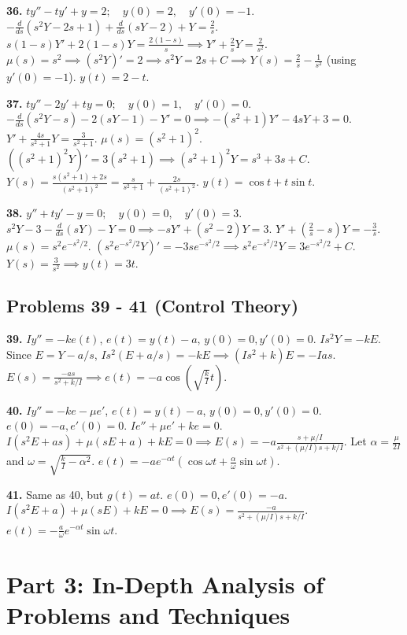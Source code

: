 \documentclass[11pt, letterpaper]{article}
\theoremstyle{definition}
\theoremstyle{remark}
\begin{document}
\textbf{36.} $ty'' - ty' + y = 2 ; \quad y(0) = 2 , \quad y'(0) = -1$.
$-\frac{d}{ds}(s^2 Y - 2s + 1) + \frac{d}{ds}(sY - 2) + Y = \frac{2}{s}$.
$s(1 - s)Y' + 2(1 - s)Y = \frac{2(1 - s)}{s} \implies Y' + \frac{2}{s}Y = \frac{2}{s^2}$.
$\mu(s) = s^2 \implies (s^2 Y)' = 2 \implies s^2 Y = 2s + C \implies Y(s) = \frac{2}{s} - \frac{1}{s^2}$ (using $y'(0)=-1$).
$y(t) = 2 - t$.

\textbf{37.} $ty'' - 2y' + ty = 0 ; \quad y(0) = 1 , \quad y'(0) = 0$.
$-\frac{d}{ds}(s^2 Y - s) - 2(sY - 1) - Y' = 0 \implies -(s^2 + 1)Y' - 4sY + 3 = 0$.
$Y' + \frac{4s}{s^2 + 1}Y = \frac{3}{s^2 + 1}$. $\mu(s) = (s^2 + 1)^2$.
$((s^2 + 1)^2 Y)' = 3(s^2 + 1) \implies (s^2 + 1)^2 Y = s^3 + 3s + C$.
$Y(s) = \frac{s(s^2 + 1) + 2s}{(s^2 + 1)^2} = \frac{s}{s^2 + 1} + \frac{2s}{(s^2 + 1)^2}$.
$y(t) = \cos t + t \sin t$.

\textbf{38.} $y'' + ty' - y = 0 ; \quad y(0) = 0 , \quad y'(0) = 3$.
$s^2 Y - 3 - \frac{d}{ds}(sY) - Y = 0 \implies -sY' + (s^2 - 2)Y = 3$.
$Y' + \left( \frac{2}{s} - s \right)Y = -\frac{3}{s}$. $\mu(s) = s^2 e^{-s^2/2}$.
$(s^2 e^{-s^2/2} Y)' = -3s e^{-s^2/2} \implies s^2 e^{-s^2/2} Y = 3e^{-s^2/2} + C$.
$Y(s) = \frac{3}{s^2} \implies y(t) = 3t$.

\subsection*{Problems 39 - 41 (Control Theory)}
\textbf{39.} $Iy'' = -ke(t)$, $e(t) = y(t) - a$, $y(0)=0, y'(0)=0$.
$I s^2 Y = -k E$. Since $E = Y - a/s$, $I s^2 (E + a/s) = -k E \implies (I s^2 + k)E = -I a s$.
$E(s) = \frac{-a s}{s^2 + k/I} \implies e(t) = -a \cos\left(\sqrt{\frac{k}{I}} t\right)$.

\textbf{40.} $Iy'' = -ke - \mu e'$, $e(t) = y(t) - a$, $y(0)=0, y'(0)=0$.
$e(0) = -a, e'(0) = 0$. $I e'' + \mu e' + k e = 0$.
$I(s^2 E + a s) + \mu(s E + a) + k E = 0 \implies E(s) = -a \frac{s + \mu/I}{s^2 + (\mu/I)s + k/I}$.
Let $\alpha = \frac{\mu}{2I}$ and $\omega = \sqrt{\frac{k}{I} - \alpha^2}$.
$e(t) = -a e^{-\alpha t} \left( \cos \omega t + \frac{\alpha}{\omega} \sin \omega t \right)$.

\textbf{41.} Same as 40, but $g(t) = at$. $e(0) = 0, e'(0) = -a$.
$I(s^2 E + a) + \mu(s E) + k E = 0 \implies E(s) = \frac{-a}{s^2 + (\mu/I)s + k/I}$.
$e(t) = -\frac{a}{\omega} e^{-\alpha t} \sin \omega t$.

\newpage
\section{Part 3: In-Depth Analysis of Problems and Techniques}
\end{document}
